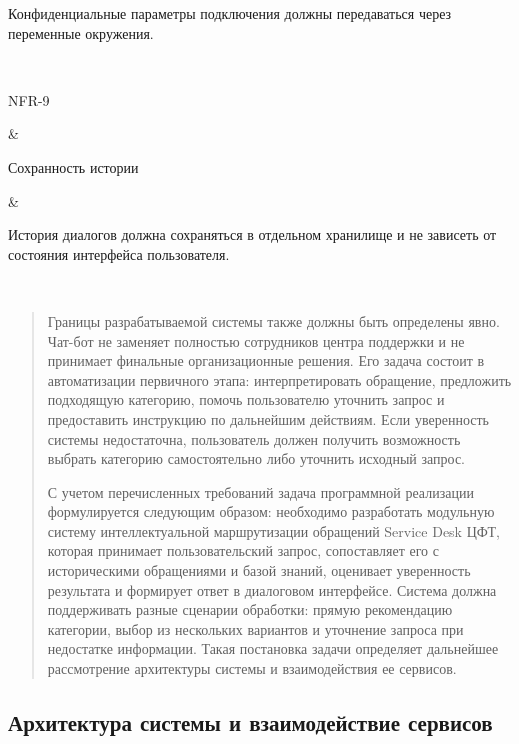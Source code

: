 \begin{longtable}[]
\begin{minipage}[b]{\linewidth}
Конфиденциальные параметры подключения должны передаваться через
переменные окружения.
\end{minipage} \\
\begin{minipage}[b]{\linewidth}\raggedright
NFR-9
\end{minipage} & \begin{minipage}[b]{\linewidth}\raggedright
Сохранность истории
\end{minipage} & \begin{minipage}[b]{\linewidth}\raggedright
История диалогов должна сохраняться в отдельном хранилище и не зависеть
от состояния интерфейса пользователя.
\end{minipage} \\
\midrule\noalign{}
\endhead
\bottomrule\noalign{}
\endlastfoot
\end{longtable}

\begin{quote}
Границы разрабатываемой системы также должны быть определены явно.
Чат-бот не заменяет полностью сотрудников центра поддержки и не
принимает финальные организационные решения. Его задача состоит в
автоматизации первичного этапа: интерпретировать обращение, предложить
подходящую категорию, помочь пользователю уточнить запрос и предоставить
инструкцию по дальнейшим действиям. Если уверенность системы
недостаточна, пользователь должен получить возможность выбрать категорию
самостоятельно либо уточнить исходный запрос.

С учетом перечисленных требований задача программной реализации
формулируется следующим образом: необходимо разработать модульную
систему интеллектуальной маршрутизации обращений Service Desk ЦФТ,
которая принимает пользовательский запрос, сопоставляет его с
историческими обращениями и базой знаний, оценивает уверенность
результата и формирует ответ в диалоговом интерфейсе. Система должна
поддерживать разные сценарии обработки: прямую рекомендацию категории,
выбор из нескольких вариантов и уточнение запроса при недостатке
информации. Такая постановка задачи определяет дальнейшее рассмотрение
архитектуры системы и взаимодействия ее сервисов.
\end{quote}

\hypertarget{ux430ux440ux445ux438ux442ux435ux43aux442ux443ux440ux430-ux441ux438ux441ux442ux435ux43cux44b-ux438-ux432ux437ux430ux438ux43cux43eux434ux435ux439ux441ux442ux432ux438ux435-ux441ux435ux440ux432ux438ux441ux43eux432}{%
\subsection{Архитектура системы и взаимодействие
сервисов}\label{ux430ux440ux445ux438ux442ux435ux43aux442ux443ux440ux430-ux441ux438ux441ux442ux435ux43cux44b-ux438-ux432ux437ux430ux438ux43cux43eux434ux435ux439ux441ux442ux432ux438ux435-ux441ux435ux440ux432ux438ux441ux43eux432}}

